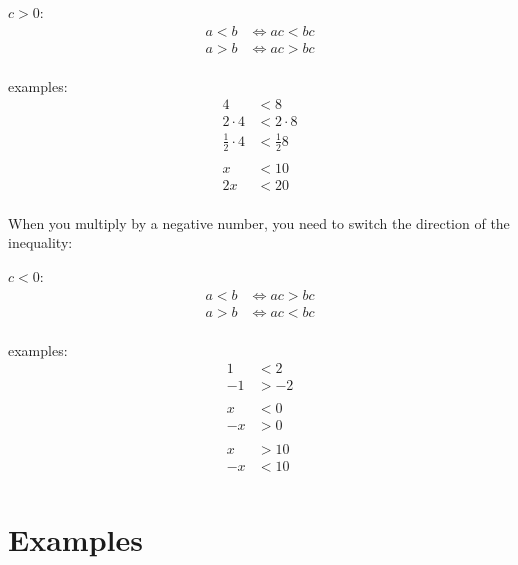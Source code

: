 \documentclass[letterpaper, landscape]{exam}
\begin{document}
  $c > 0$:
  \begin{align*}
    a < b & \iff ac < bc \\
    a > b & \iff ac > bc \\
  \end{align*}

  examples:
  \begin{align*}
    4                   & < 8 \\
    2 \cdot 4           & < 2 \cdot 8 \\
    \frac{1}{2} \cdot 4 & < \frac{1}{2} 8 \\
    \\
    x  & < 10 \\
    2x & < 20 \\
  \end{align*}

  When you multiply by a negative number, you need to switch the direction of
  the inequality:
  
  $c < 0$:
  \begin{align*}
    a < b & \iff ac > bc \\
    a > b & \iff ac < bc \\
  \end{align*}

  examples:
  \begin{align*}
    1  & < 2 \\
    -1 & > -2 \\
    \\
    x  & < 0 \\
    -x & > 0 \\
    \\
    x  & > 10 \\
    -x & < 10 \\
  \end{align*}
    
  \section{Examples} %
\end{document}
